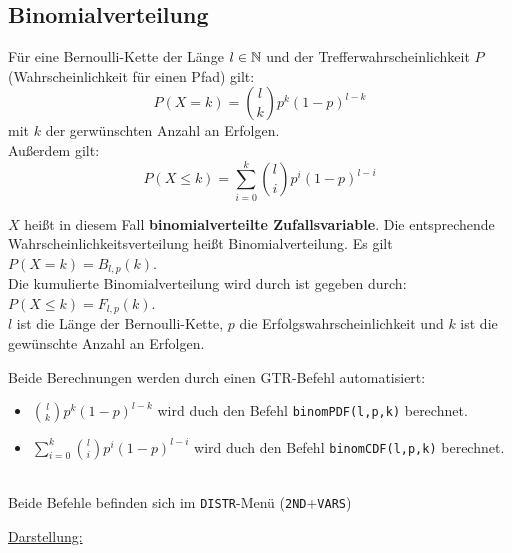 \documentclass[main.tex]{subfiles}
\begin{document}
\subsection{Binomialverteilung}
\begin{Theorem}
  Für eine Bernoulli-Kette der Länge $l \in \mathbb{N}$ und der Trefferwahrscheinlichkeit $P$ (Wahrscheinlichkeit für einen Pfad) gilt:
  $$P(X=k) = {l \choose k} p^k (1-p) ^{l-k}$$
  mit $k$ der gerwünschten Anzahl an Erfolgen.\\
  Außerdem gilt:
  $$P(X\leq k) = \sum_{i=0}^{k}{l \choose i} p^i (1-p) ^{l-i}$$
\end{Theorem}
\begin{Bemerkung}
  \begin{Definition}
    $X$ heißt in diesem Fall \textbf{binomialverteilte Zufallsvariable}. Die entsprechende Wahrscheinlichkeitsverteilung heißt Binomialverteilung. Es gilt $P(X=k) =  B_{l,p}(k)$.\\
    Die kumulierte Binomialverteilung wird durch ist gegeben durch: $P(X \leq k) = F_{l,p}(k)$.\\
     $l$ ist die Länge der Bernoulli-Kette, $p$ die Erfolgswahrscheinlichkeit und $k$ ist die gewünschte Anzahl an Erfolgen.

  \end{Definition}
\end{Bemerkung}
\begin{GTR-Tipp}
  Beide Berechnungen werden durch einen GTR-Befehl automatisiert:\\
  \begin{itemize}
    \item $\displaystyle{{l \choose k}} p^k (1-p) ^{l-k}$ wird duch den Befehl \texttt{binomPDF(l,p,k)} berechnet.
    \item $\displaystyle{\sum_{i=0}^{k}{l \choose i}} p^i (1-p) ^{l-i}$ wird duch den Befehl \texttt{binomCDF(l,p,k)} berechnet.
  \end{itemize}\\
  Beide Befehle befinden sich im \texttt{DISTR}-Menü (\texttt{2ND}+\texttt{VARS})
\end{GTR-Tipp}
\underline{Darstellung:}\\
\begin{minipage}{0.5\textwidth}
\end{minipage}
\end{document}
